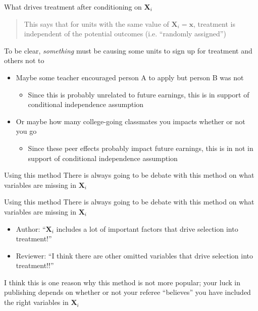 \documentclass[aspectratio=169,t,11pt,table]{beamer}
\begin{document}
\begin{frame}{What drives treatment after conditioning on $\bm{X}_i$}
  \bigskip
  \begin{quote}
    This says that for units with the same value of $\bm{X}_i = \bm{x}$, treatment is independent of the potential outcomes (i.e. ``randomly assigned'')
  \end{quote}

  \bigskip
  To be clear, \emph{something} must be causing some units to sign up for treatment and others not to
  \begin{itemize}
    \item Maybe some teacher encouraged person A to apply but person B was not 
    \begin{itemize}
      \item Since this is probably unrelated to future earnings, this is in support of conditional independence assumption
    \end{itemize}
    
    \pause
    \item Or maybe how many college-going classmates you impacts whether or not you go
    \begin{itemize}
      \item Since these peer effects probably impact future earnings, this is in not in support of conditional independence assumption
    \end{itemize}
  \end{itemize}
\end{frame}

\begin{frame}{Using this method}
  There is always going to be debate with this method on what variables are missing in $\bm{X}_i$
\end{frame}


\begin{frame}{Using this method}
  There is always going to be debate with this method on what variables are missing in $\bm{X}_i$
  \begin{itemize}
    \item Author: ``$\bm{X}_i$ includes a lot of important factors that drive selection into treatment!''
    \item Reviewer: ``I think there are other omitted variables that drive selection into treatment!!''
  \end{itemize}

  \bigskip
  I think this is one reason why this method is not more popular; your luck in publishing depends on whether or not your referee ``believes'' you have included the right variables in $\bm{X}_i$
\end{frame}
\end{document}
